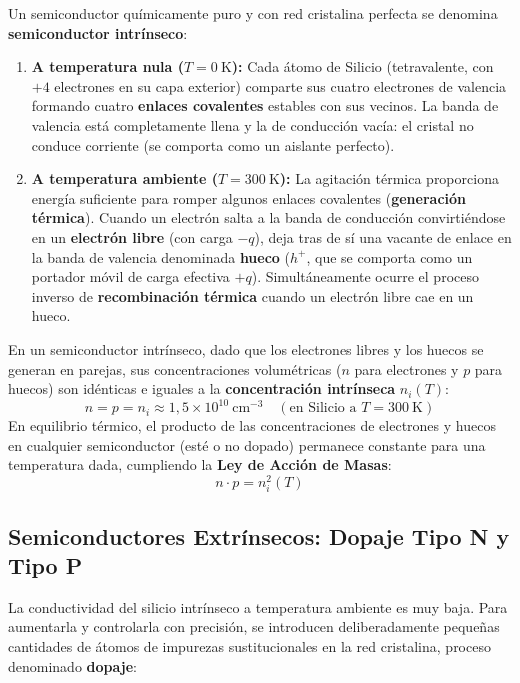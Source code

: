 Un semiconductor químicamente puro y con red cristalina perfecta se denomina \textbf{semiconductor intrínseco}:
\begin{enumerate}[leftmargin=*]
    \item \textbf{A temperatura nula ($T = 0\ \si{\kelvin}$):} Cada átomo de Silicio (tetravalente, con $+4$ electrones en su capa exterior) comparte sus cuatro electrones de valencia formando cuatro \textbf{enlaces covalentes} estables con sus vecinos. La banda de valencia está completamente llena y la de conducción vacía: el cristal no conduce corriente (se comporta como un aislante perfecto).
    \item \textbf{A temperatura ambiente ($T = 300\ \si{\kelvin}$):} La agitación térmica proporciona energía suficiente para romper algunos enlaces covalentes (\textbf{generación térmica}). Cuando un electrón salta a la banda de conducción convirtiéndose en un \textbf{electrón libre} (con carga $-q$), deja tras de sí una vacante de enlace en la banda de valencia denominada \textbf{hueco} ($h^+$, que se comporta como un portador móvil de carga efectiva $+q$). Simultáneamente ocurre el proceso inverso de \textbf{recombinación térmica} cuando un electrón libre cae en un hueco.
\end{enumerate}

\begin{ley}
En un semiconductor intrínseco, dado que los electrones libres y los huecos se generan en parejas, sus concentraciones volumétricas ($n$ para electrones y $p$ para huecos) son idénticas e iguales a la \textbf{concentración intrínseca} $n_i(T)$:
\begin{equation}
    n = p = n_i \approx 1{,}5 \times 10^{10}\ \si{\centi\meter^{-3}} \quad (\text{en Silicio a } T = 300\ \si{\kelvin})
\end{equation}
En equilibrio térmico, el producto de las concentraciones de electrones y huecos en cualquier semiconductor (esté o no dopado) permanece constante para una temperatura dada, cumpliendo la \textbf{Ley de Acción de Masas}:
\begin{equation}
    n \cdot p = n_i^2(T)
\end{equation}
\end{ley}

\subsection{Semiconductores Extrínsecos: Dopaje Tipo N y Tipo P}
La conductividad del silicio intrínseco a temperatura ambiente es muy baja. Para aumentarla y controlarla con precisión, se introducen deliberadamente pequeñas cantidades de átomos de impurezas sustitucionales en la red cristalina, proceso denominado \textbf{dopaje}:

